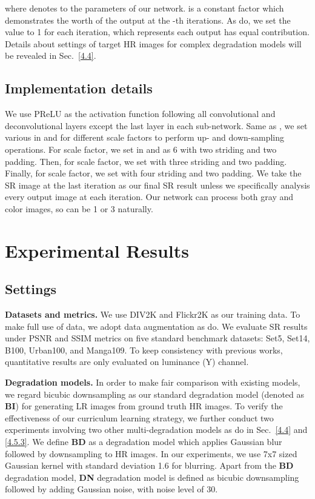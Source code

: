 \documentclass[10pt,twocolumn,letterpaper]{article}
\begin{document}
	where  denotes to the parameters of our network.  is a constant factor which demonstrates the worth of the output at the -th iterations. As \cite{Zamir_2017_CVPR} do, we set the value to 1 for each iteration, which represents each output has equal contribution. Details about settings of target HR images for complex degradation models will be revealed in Sec.~\ref{4.4}.
	
	\subsection{Implementation details}
	We use PReLU\cite{DBLP:conf/iccv/HeZRS15} as the activation function following all convolutional and deconvolutional layers except the last layer in each sub-network. Same as \cite{Haris_2018_CVPR}, we set various  in  and  for different scale factors to perform up- and down-sampling operations. For  scale factor, we set  in  and  as 6 with two striding and two padding. Then, for  scale factor, we set   with three striding and two padding. Finally, for  scale factor, we set  with four striding and two padding. We take the SR image  at the last iteration as our final SR result unless we specifically analysis every output image at each iteration. Our network can process both gray and color images, so  can be 1 or 3 naturally.
	
	\section{Experimental Results}
	\label{exp}
	
	\subsection{Settings}
	\label{4.1}
	\textbf{Datasets and metrics.} We use DIV2K\cite{Agustsson_2017_CVPR_Workshops} and Flickr2K as our training data. To make full use of data, we adopt data augmentation as \cite{lim2017enhanced} do. We evaluate SR results under PSNR and SSIM\cite{DBLP:journals/tip/WangBSS04} metrics on five standard benchmark datasets: Set5\cite{DBLP:conf/bmvc/BevilacquaRGA12}, Set14\cite{ZeydeEP10}, B100\cite{DBLP:conf/iccv/MartinFTM01}, Urban100\cite{DBLP:conf/cvpr/HuangSA15}, and Manga109\cite{DBLP:journals/mta/MatsuiIAFOYA17}. To keep consistency with previous works, quantitative results are only evaluated on luminance (Y) channel.
		
	\textbf{Degradation models.} In order to make fair comparison with existing models, we regard bicubic downsampling as our standard degradation model (denoted as \textbf{BI}) for generating LR images from ground truth HR images. To verify the effectiveness of our curriculum learning strategy, we further conduct two experiments involving two other multi-degradation models as \cite{Zhang_2018_CVPR} do in Sec.~\ref{4.4} and \ref{4.5.3}. We define \textbf{BD} as a degradation model which applies Gaussian blur followed by downsampling to HR images. In our experiments, we use 7x7 sized Gaussian kernel with standard deviation 1.6 for blurring. Apart from the \textbf{BD} degradation model, \textbf{DN} degradation model is defined as bicubic downsampling followed by adding Gaussian noise, with noise level of 30. 
	
\end{document}
